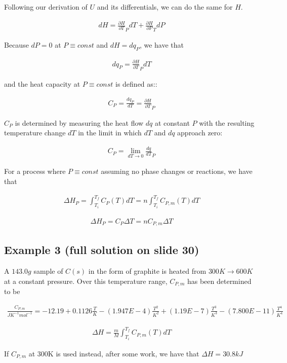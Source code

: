 \documentclass[12pt]{article}
\begin{document}
Following our derivation of $U$ and its differentials, we can do the same for $H$.

\begin{align*}
    dH=\frac{\partial H}{\partial T}_P dT+\frac{\partial H}{\partial P}_T dP
\end{align*}

Because $dP=0$ at $P\equiv const$ and $dH=dq_P$, we have that

\begin{align*}
    dq_P=\frac{\partial H}{\partial T}_P dT
\end{align*}

and the heat capacity at $P\equiv const$ is defined as::

\begin{align*}
    C_P=\frac{dq_P}{dT}=\frac{\partial H}{\partial T}_P
\end{align*}

$C_P$ is determined by measuring the heat flow $dq$ at constant $P$ with the resulting temperature
change $dT$ in the limit in which $dT$ and $dq$ approach zero:

\begin{align*}
    C_P=\lim_{dT\rightarrow 0}\frac{dq}{dT}_P
\end{align*}

For a process where $P\equiv const$ assuming no phase changes or reactions, we have that

\begin{align*}
    \Delta H_P=\int_{T_i}^{T_f}C_P(T)dT=n\int_{T_i}^{T_f}C_{P,m}(T)dT
\end{align*}

\begin{align*}
    \Delta H_P=C_P\Delta T=nC_{P,m}\Delta T
\end{align*}

\subsection*{Example 3 (full solution on slide 30)}

A $143.0g$ sample of $C(s)$ in the form of graphite is heated from $300K \rightarrow 600K$ at a
constant pressure. Over this temperature range, $C_{P,m}$ has been determined to be

\begin{align*}
    \frac{C_{P,m}}{JK^{-1}mol^{-1}}=-12.19+0.1126\frac{T}{K}-(1.947E-4)\frac{T^2}{K^2}+(1.19E-7)\frac{T^3}{K^3}-(7.800E-11)\frac{T^4}{K^4}
\end{align*}

\begin{align*}
    \Delta H=\frac{m}{M}\int_{T_i}^{T_f}C_{P,m}(T)dT
\end{align*}

If $C_{P,m}$ at 300K is used instead, after some work, we have that $\Delta H=30.8kJ$
\end{document}
